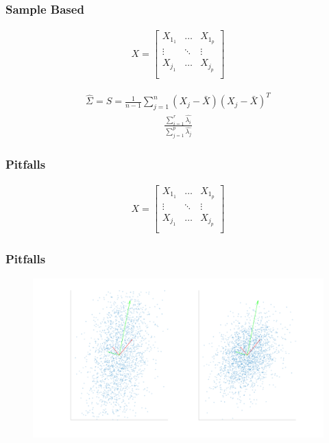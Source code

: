 \documentclass[aspectratio=169,10pt,t]{beamer}
\begin{document}
\begin{frame}[t]
    \frametitle{Sample Based}

    \begin{align*}
    X = \begin{bmatrix}
        X_1_1 & \hdots & X_1_p \\
        \vdots &  \ddots & \vdots  \\
        X_j_1 & \hdots & X_j_p \\
    \end{bmatrix}
    \end{align*}

    \begin{align*}
        \hat{\Sigma} = S = \frac{1}{n-1} \sum^{n}_{j=1} (X_j - \bar{X} )(X_j - \bar{X} )^T
    \end{align*}
   \begin{align*}
    \frac{ \sum^{r}_{i=1} \hat{\lambda_i}  }{ \sum^{p}_{j=1} \hat{\lambda_j}  }
   \end{align*}
    

    
\end{frame}

\begin{frame}[t]
    \frametitle{Pitfalls}

    \begin{align*}
    X = \begin{bmatrix}
        X_1_1 & \hdots & X_1_p \\
        \vdots &  \ddots & \vdots  \\
        X_j_1 & \hdots & X_j_p \\
    \end{bmatrix}
    \end{align*}

    
\end{frame}

\begin{frame}[t]
    \frametitle{Pitfalls}

    \begin{figure}[H]
        \centering
        \includegraphics[width=0.8\linewidth]{images/compare.png}
    \end{figure}
    
\end{frame}
\end{document}
